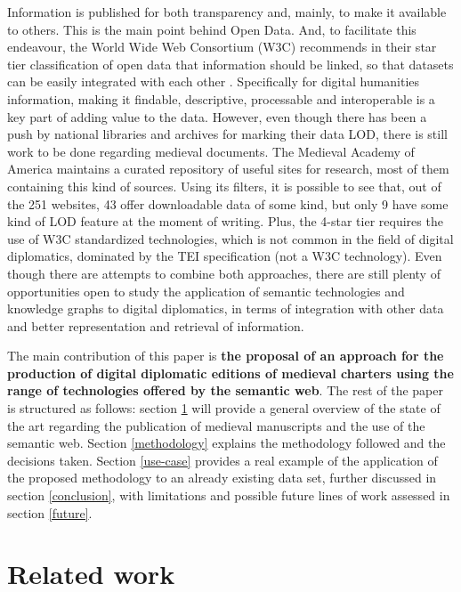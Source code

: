 \documentclass{article}
\begin{document}
Information is published for both transparency and, mainly, to make it available to others.
This is the main point behind Open Data.
And, to facilitate this endeavour, the World Wide Web Consortium (W3C) recommends in their star tier classification of open data that information should be linked, so that datasets can be easily integrated with each other \cite{berners-lee_linked_nodate}.
Specifically for digital humanities information, making it findable, descriptive, processable and interoperable is a key part of adding value to the data\cite{jian2026data}.
However, even though there has been a push by national libraries and archives for marking their data LOD\cite{candela2023lod}, there is still work to be done regarding medieval documents.
The Medieval Academy of America maintains a curated repository of useful sites for research, most of them containing this kind of sources.
Using its filters, it is possible to see that, out of the 251 websites, 43 offer downloadable data of some kind, but only 9 have some kind of LOD feature at the moment of writing.
Plus, the 4-star tier requires the use of W3C standardized technologies, which is not common in the field of digital diplomatics, dominated by the TEI specification (not a W3C technology).
Even though there are attempts to combine both approaches\cite{vujosevic_encoding_2026}, there are still plenty of opportunities open to study the application of semantic technologies and knowledge graphs to digital diplomatics,
in terms of integration with other data and better representation and retrieval of information\cite{burrows_linked_2022}.

The main contribution of this paper is \textbf{the proposal of an approach for the production of digital diplomatic editions of medieval charters using the range of technologies offered by the semantic web}\cite{merono2015semantic}.
The rest of the paper is structured as follows: section \ref{related-work} will provide a general overview of the state of the art regarding the publication of medieval manuscripts and the use of the semantic web.
Section \ref{methodology} explains the methodology followed and the decisions taken.
Section \ref{use-case} provides a real example of the application of the proposed methodology to an already existing data set, further discussed in section \ref{conclusion}, with limitations and possible future lines of work assessed in section \ref{future}.

\section{Related work}
\label{related-work}
\end{document}
